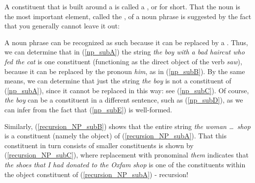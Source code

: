 \documentclass{article}
\begin{document}
A constituent that is built around a  is called a , or  for short.
That the noun is the most important element, called the , of a noun phrase is suggested by the fact that you generally cannot leave it out:
\begin{exe}
\end{exe}

A noun phrase can be recognized as such because it can be replaced by a .
Thus, we can determine that in (\ref{np_subA}) the string \emph{the boy with a bad haircut who fed the cat} is one constituent (functioning as the direct object of the verb \emph{saw}), because it can be replaced by the pronoun \emph{him}, as in (\ref{np_subB}).
By the same means, we can determine that just the string \emph{the boy} is not a constituent of (\ref{np_subA}), since it cannot be replaced in this way: see (\ref{np_subC}).
Of course, \emph{the boy} can be a constituent in a different sentence, such as (\ref{np_subD}), as we can infer from the fact that (\ref{np_subE}) is well-formed.
\begin{exe}
\end{exe}

Similarly, (\ref{recursion_NP_subB}) shows that the entire string \emph{the woman \ldots\ shop} is a constituent (namely the object) of (\ref{recursion_NP_subA}).
That this constituent in turn consists of smaller constituents is shown by (\ref{recursion_NP_subC}), where replacement with pronominal \emph{them} indicates that \emph{the shoes that I had donated to the Oxfam shop} is one of the constituents within the object constituent of (\ref{recursion_NP_subA}) - recursion! 
\begin{exe}
\end{exe}
\end{document}
